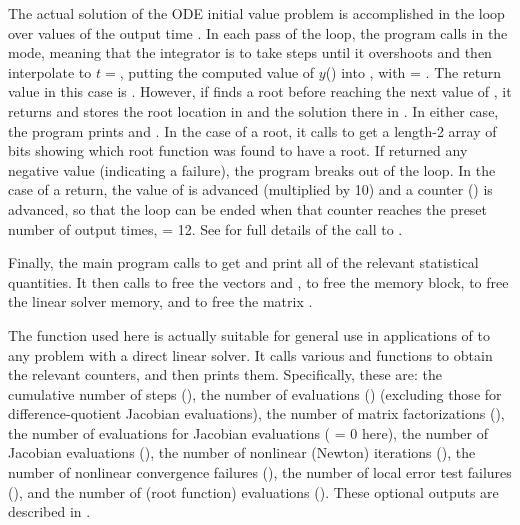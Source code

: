 The actual solution of the ODE initial value problem is accomplished in
the loop over values of the output time .  In each pass of the
loop, the program calls  in the  mode, meaning that
the integrator is to take steps until it overshoots  and then
interpolate to $t = $, putting the computed value of $y$()
into , with  = .  The return value in this case is
.  However, if  finds a root before reaching the next
value of , it returns  and stores the root
location in  and the solution there in .  In either case, the
program prints  and .  In the case of a root, it calls
 to get a length-2 array  of bits showing
which root function was found to have a root.  If  returned any
negative value (indicating a failure), the program breaks out of the loop.  
In the case of a  return, the value of  is
advanced (multiplied by 10) and a counter () is advanced, so
that the loop can be ended when that counter reaches the preset number
of output times,  = 12.  See  for full
details of the call to .

Finally, the main program calls  to get and print
all of the relevant statistical quantities.  It then calls 
to free the vectors  and ,  to free the 
{\cvode} memory block,  to free the linear solver
memory, and  to free the matrix .

The function  used here is actually suitable for
general use in applications of {\cvode} to any problem with a direct
linear solver.  It calls various  and 
functions to obtain the relevant counters, and then prints them.
Specifically, these are: the cumulative number of steps (), 
the number of  evaluations () (excluding those for
difference-quotient Jacobian evaluations),
the number of matrix factorizations (),
the number of  evaluations for Jacobian evaluations (
= 0 here),
the number of Jacobian evaluations (),
the number of nonlinear (Newton) iterations (),
the number of nonlinear convergence failures (),
the number of local error test failures (), and
the number of  (root function) evaluations ().
These optional outputs are described in .

